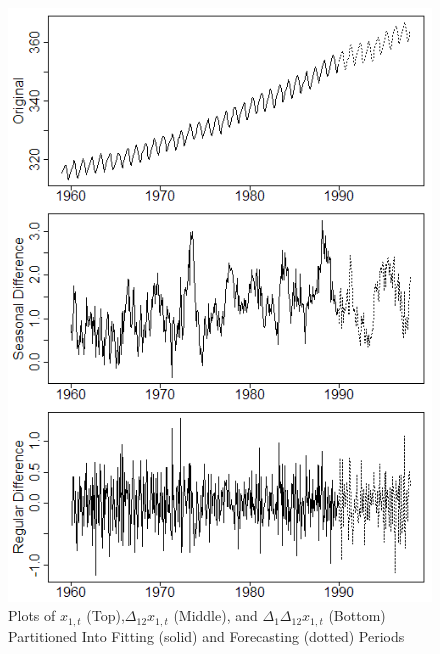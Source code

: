 \begin{figure}[htbp!]
	\centering
	\caption{Plots of $x_{1,t}$ (Top),$\Delta_{12}x_{1,t}$ (Middle), and $\Delta_1\Delta_{12}x_{1,t}$ (Bottom) Partitioned Into Fitting (solid) and Forecasting (dotted) Periods}
	\label{fig:co2plots}
	\includegraphics[scale=0.8]{co2plots}
\end{figure}

